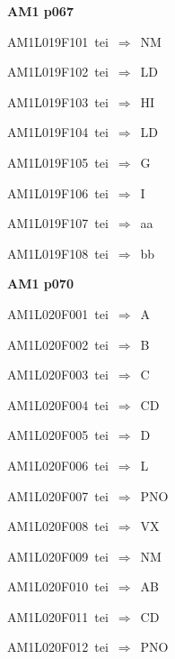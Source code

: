 \par\vfill\eject
{\bf\hfill AM1 p067\hfill\hbox{}}\par\bigskip
{\sixrm AM1L019F101\ {\sixit tei}\ }$\Rightarrow$\ NM\par\smallskip
{\sixrm AM1L019F102\ {\sixit tei}\ }$\Rightarrow$\ LD\par\smallskip
{\sixrm AM1L019F103\ {\sixit tei}\ }$\Rightarrow$\ HI\par\smallskip
{\sixrm AM1L019F104\ {\sixit tei}\ }$\Rightarrow$\ LD\par\smallskip
{\sixrm AM1L019F105\ {\sixit tei}\ }$\Rightarrow$\ G\par\smallskip
{\sixrm AM1L019F106\ {\sixit tei}\ }$\Rightarrow$\ I\par\smallskip
{\sixrm AM1L019F107\ {\sixit tei}\ }$\Rightarrow$\ {\tenit aa}\par\smallskip
{\sixrm AM1L019F108\ {\sixit tei}\ }$\Rightarrow$\ {\tenit bb}\par\smallskip

\par\vfill\eject
{\bf\hfill AM1 p070\hfill\hbox{}}\par\bigskip
{\sixrm AM1L020F001\ {\sixit tei}\ }$\Rightarrow$\ A\par\smallskip
{\sixrm AM1L020F002\ {\sixit tei}\ }$\Rightarrow$\ B\par\smallskip
{\sixrm AM1L020F003\ {\sixit tei}\ }$\Rightarrow$\ C\par\smallskip
{\sixrm AM1L020F004\ {\sixit tei}\ }$\Rightarrow$\ CD\par\smallskip
{\sixrm AM1L020F005\ {\sixit tei}\ }$\Rightarrow$\ D\par\smallskip
{\sixrm AM1L020F006\ {\sixit tei}\ }$\Rightarrow$\ L\par\smallskip
{\sixrm AM1L020F007\ {\sixit tei}\ }$\Rightarrow$\ PNO\par\smallskip
{\sixrm AM1L020F008\ {\sixit tei}\ }$\Rightarrow$\ VX\par\smallskip
{\sixrm AM1L020F009\ {\sixit tei}\ }$\Rightarrow$\ NM\par\smallskip
{\sixrm AM1L020F010\ {\sixit tei}\ }$\Rightarrow$\ AB\par\smallskip
{\sixrm AM1L020F011\ {\sixit tei}\ }$\Rightarrow$\ CD\par\smallskip
{\sixrm AM1L020F012\ {\sixit tei}\ }$\Rightarrow$\ PNO\par\smallskip


